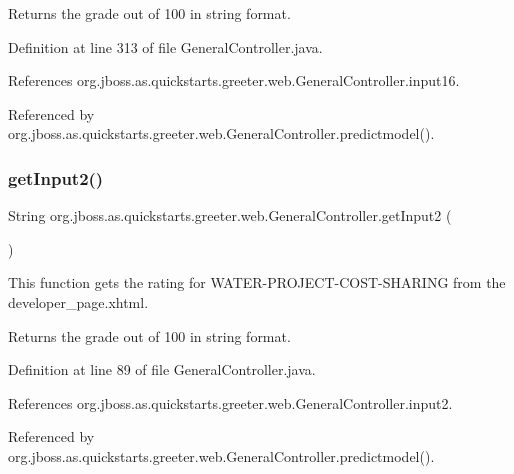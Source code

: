 \begin{DoxyReturn}{Returns}
the grade out of 100 in string format. 
\end{DoxyReturn}


Definition at line 313 of file General\+Controller.\+java.



References org.\+jboss.\+as.\+quickstarts.\+greeter.\+web.\+General\+Controller.\+input16.



Referenced by org.\+jboss.\+as.\+quickstarts.\+greeter.\+web.\+General\+Controller.\+predictmodel().

\mbox{\label{classorg_1_1jboss_1_1as_1_1quickstarts_1_1greeter_1_1web_1_1_general_controller_a3323e828092c49671a9076a31fd401ce}} 
\subsubsection{\texorpdfstring{get\+Input2()}{getInput2()}}
{\footnotesize\ttfamily String org.\+jboss.\+as.\+quickstarts.\+greeter.\+web.\+General\+Controller.\+get\+Input2 (\begin{DoxyParamCaption}{ }\end{DoxyParamCaption})}



This function gets the rating for W\+A\+T\+E\+R-\/\+P\+R\+O\+J\+E\+C\+T-\/\+C\+O\+S\+T-\/\+S\+H\+A\+R\+I\+NG from the developer\+\_\+page.\+xhtml. 

\begin{DoxyReturn}{Returns}
the grade out of 100 in string format. 
\end{DoxyReturn}


Definition at line 89 of file General\+Controller.\+java.



References org.\+jboss.\+as.\+quickstarts.\+greeter.\+web.\+General\+Controller.\+input2.



Referenced by org.\+jboss.\+as.\+quickstarts.\+greeter.\+web.\+General\+Controller.\+predictmodel().


